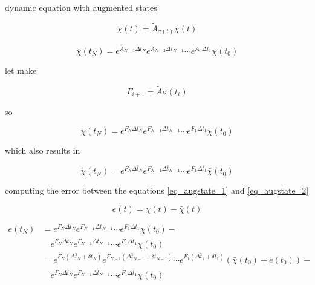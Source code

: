 \documentclass[smallextended,referee,envcountsect,]{svjour3}
\begin{document}
dynamic equation with augmented states

\begin{equation}
   \chi(t) = \tilde{A}_{\sigma(t)} \chi(t)
\end{equation}

\begin{equation}
   \chi(t_N) = 
      e^{\tilde{A}_{N-1} \Delta t_N}
      e^{\tilde{A}_{N-2} \Delta t_{N-1}}
      \dotsm
      e^{\tilde{A}_{0} \Delta t_{1}}
      \chi(t_0)
\end{equation}

let make 

\begin{equation}
   F_{i+1} = \tilde{A}\sigma(t_i)
\end{equation}

so

\begin{equation}
   \label{eq_augstate_1}
   \chi(t_N) = 
      e^{F_N \Delta t_N}
      e^{F_{N-1} \Delta t_{N-1}}
      \dotsm
      e^{F_{1} \Delta t_{1}}
      \chi(t_0)
\end{equation}

which also results in 

\begin{equation}
   \label{eq_augstate_2}
   \tilde{\chi}(t_N) = 
      e^{F_N \Delta \bar{t}_N}
      e^{F_{N-1} \Delta \bar{t}_{N-1}}
      \dotsm
      e^{F_{1} \Delta \bar{t}_{1}}
      \bar{\chi}(t_0)
\end{equation}

computing the error between the equations \eqref{eq_augstate_1} and \eqref{eq_augstate_2}

\begin{equation}
   e(t) = \chi(t) - \bar{\chi}(t)
\end{equation}

\begin{align}
   e(t_N) 
      &= 
      e^{F_N \Delta t_N} e^{F_{N-1} \Delta t_{N-1}} \dotsm e^{F_{1} \Delta t_{1}} \chi(t_0) - \\
      & \quad e^{F_N \Delta \bar{t}_N} e^{F_{N-1} \Delta \bar{t}_{N-1}} \dotsm e^{F_{1} \Delta \bar{t}_{1}} \chi(t_0) \\
      &= 
      e^{F_N (\Delta \bar{t}_N + \delta t_N)} e^{F_{N-1} (\Delta \bar{t}_{N-1} + \delta t_{N-1})} \dotsm e^{F_{1} (\Delta \bar{t}_{1} + \delta t_{1})} (\bar{\chi}(t_0) + e(t_0)) - \\
      & \quad e^{F_N \Delta \bar{t}_N} e^{F_{N-1} \Delta \bar{t}_{N-1}} \dotsm e^{F_{1} \Delta \bar{t}_{1}} \chi(t_0)
\end{align}
\end{document}
